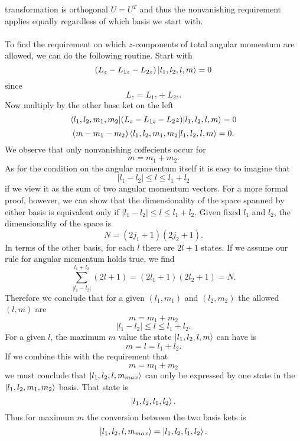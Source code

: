 \documentclass[11pt,letterpaper]{article}
\begin{document}
		transformation is orthogonal $U= U^T$ and thus the nonvanishing requirement applies equally regardless of which basis we start 
		with. 
		\\
		\\
		To find the requirement on which $z$-components of total angular momentum are allowed, we can do the following routine. 
		Start with
		\[
			(L_z-L_{1z}-L_{2z})\ket{l_1,l_2,l,m} = 0 
		\]
		since 
		\[
			L_z = L_{1z}+L_{2z}.
		\]
		Now multiply by the other base ket on the left
		\[
			\braket{l_1,l_2,m_1,m_2|(L_z-L_{1z}-{L_2z})|l_1,l_2,l,m} = 0 
		\]
		\[
			(m-m_1-m_2)\braket{l_1,l_2,m_1,m_2|l_1,l_2,l,m} = 0.
		\]
		We observe that only nonvanishing coffecients occur for
		\[
			m = m_1+m_2.
		\]
		As for the condition on the angular momentum itself it is easy to imagine that
		\[
			|l_1-l_2|\le l \le l_1+l_2
		\]
		if we view it as the sum of two angular momentum vectors. For a more formal proof, however, we can show that the 
		dimensionality of the space spanned by either basis is equivalent only if $|l_1-l_2|\le l \le l_1+l_2$. Given fixed
		$l_1$ and $l_2$, the dimensionality of the space is 
		\[
			N = (2j_1+1)(2j_2+1).
		\]
		In terms of the other basis, for each $l$ there are $2l+1$ states. If we assume our rule for angular momentum holds true,
		we find
		\[
			\sum_{|l_1-l_2|}^{l_1+l_2} (2l+1) = (2l_1+1)(2l_2+1)= N.
		\]
		Therefore we conclude that for a given $(l_1,m_1)$ and $(l_2,m_2)$ the allowed $(l,m)$ are
		\[
			m = m_1+m_2
		\]
		\[
			|l_1-l_2|\le l \le l_1+l_2.
		\]
		For a given $l$, the maximum $m$ value the state $\ket{l_1,l_2,l,m}$ can have is 
		\[
			m = l = l_1+l_2.
		\]
		If we combine this with the requirement that
		\[
			m = m_1+m_2
		\]
		we must conclude that $\ket{l_1,l_2,l,m_{max}}$ can only be expressed by one state in the $\ket{l_1,l_2,m_1,m_2}$ basis. That 
		state is 
		\[
			\ket{l_1,l_2,l_1,l_2}.
		\]
		Thus for maximum $m$ the conversion between the two basis kets is
		\[
			\ket{l_1,l_2,l,m_{max}} = \ket{l_1,l_2,l_1,l_2}.
		\]
		\\
		
\end{document}
